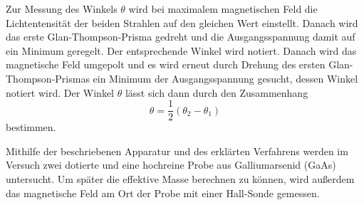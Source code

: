 Zur Messung des Winkels $\theta$ wird bei maximalem magnetischen Feld die Lichtentensität
der beiden Strahlen auf den gleichen Wert einstellt. Danach wird das erste Glan-Thompson-Prisma
gedreht und die Ausgangsspannung damit auf ein Minimum geregelt. Der entsprechende
Winkel wird notiert. Danach wird das magnetische Feld umgepolt und es wird erneut
durch Drehung des ersten Glan-Thompson-Prismas ein Minimum der Ausgangsspannung gesucht,
dessen Winkel notiert wird. Der Winkel $\theta$ lässt sich dann durch den Zusammenhang
\begin{equation}
  \theta  = \frac{1}{2} (\theta_2 - \theta_1)
\label{eqn:drehwinkel}
\end{equation}
bestimmen.
\cite{Bitte theta2 und theta1 erklären.}

Mithilfe der beschriebenen Apparatur und des erklärten Verfahrens werden im Versuch zwei dotierte
und eine hochreine Probe aus Galliumarsenid (GaAs) untersucht. Um später die effektive Masse berechnen zu
können, wird außerdem das magnetische Feld am Ort der Probe mit einer Hall-Sonde gemessen.
